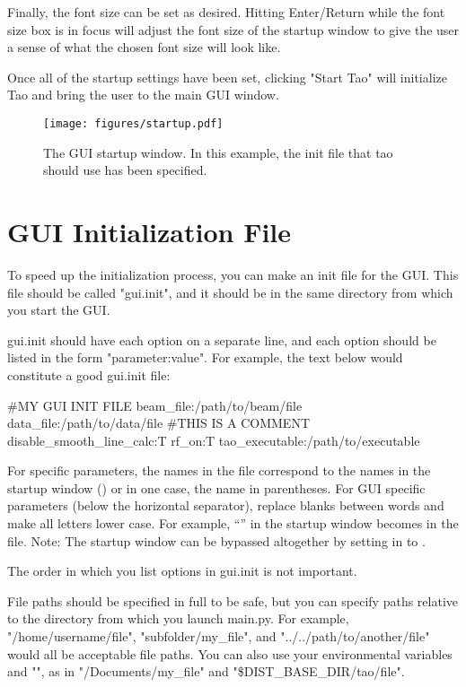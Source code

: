 Finally, the font size can be set as desired. Hitting Enter/Return while the font size box is in
focus will adjust the font size of the startup window to give the user a sense of what the chosen
font size will look like.

Once all of the startup settings have been set, clicking "Start Tao" will initialize Tao and bring
the user to the main GUI window.

\begin{figure}
\texttt{[image: figures/startup.pdf]}
\centering
\caption[The GUI startup window.]{The GUI startup window. In this example, the init file that tao should use has been specified.}
\label{fig:startup}
\end{figure}

\section{GUI Initialization File}
\label{s:gui.init.file}

To speed up the initialization process, you can make an init file for the GUI.  This file should be called "gui.init", and it should be in the same directory from which you start the GUI.

gui.init should have each option on a separate line, and each option should be listed in the form "parameter:value".  For example, the text below would constitute a good gui.init file:
\begin{example}
  #MY GUI INIT FILE
  beam_file:/path/to/beam/file
  data_file:/path/to/data/file
  #THIS IS A COMMENT
  disable_smooth_line_calc:T
  rf_on:T
  tao_executable:/path/to/executable
\end{example}
For \tao specific parameters, the names in the  file correspond to the names in the startup window
() or in one case, the name in parentheses. For GUI specific parameters (below the horizontal separator), replace blanks between words and
make all letters lower case. For example, ``'' in the startup window becomes 
in the  file. Note: The startup window can be bypassed altogether by setting  in 
to .

The order in which you list options in gui.init is not important.

File paths should be specified in full to be safe, but you can specify paths relative to the directory from which you launch main.py.  For example, "/home/username/file", "subfolder/my_file", and "../../path/to/another/file" would all be acceptable file paths.  You can also use your environmental variables and "\ttilde", as in "\ttilde/Documents/my_file" and "\$DIST_BASE_DIR/tao/file".

